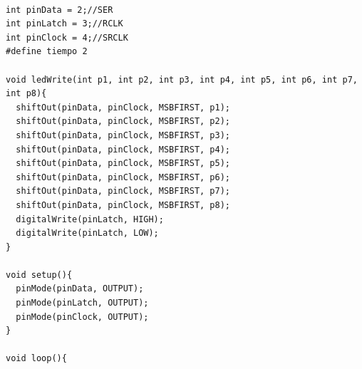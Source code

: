 \documentclass{article}
\begin{document}
 \begin{verbatim}

int pinData = 2;//SER
int pinLatch = 3;//RCLK
int pinClock = 4;//SRCLK
#define tiempo 2

void ledWrite(int p1, int p2, int p3, int p4, int p5, int p6, int p7, int p8){
  shiftOut(pinData, pinClock, MSBFIRST, p1);
  shiftOut(pinData, pinClock, MSBFIRST, p2);
  shiftOut(pinData, pinClock, MSBFIRST, p3);
  shiftOut(pinData, pinClock, MSBFIRST, p4);
  shiftOut(pinData, pinClock, MSBFIRST, p5);
  shiftOut(pinData, pinClock, MSBFIRST, p6);
  shiftOut(pinData, pinClock, MSBFIRST, p7);
  shiftOut(pinData, pinClock, MSBFIRST, p8);
  digitalWrite(pinLatch, HIGH);
  digitalWrite(pinLatch, LOW);
}

void setup(){
  pinMode(pinData, OUTPUT);
  pinMode(pinLatch, OUTPUT);
  pinMode(pinClock, OUTPUT);
}

void loop(){
  

\end{verbatim}
\end{document}
